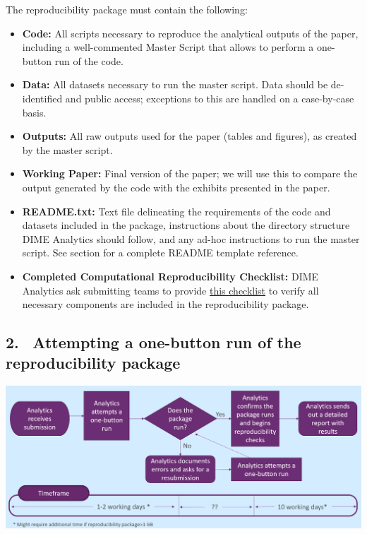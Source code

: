 \begin{fullwidth}
	The reproducibility package must contain the following:

	\bigskip

	\begin{itemize}
		\setlength\itemsep{-0.1em}
		\item \textbf{Code:} All scripts necessary to reproduce the analytical outputs of the paper, including a well-commented Master Script that allows to perform a one-button run of the code.
		\item \textbf{Data:} All datasets necessary to run the master script. Data should be de-identified and public access; exceptions to this are handled on a case-by-case basis.
		\item \textbf{Outputs:} All raw outputs used for the paper (tables and figures), as created by the master script.
		\item \textbf{Working Paper:} Final version of the paper; we will use this to compare the output generated by the code with the exhibits presented in the paper.
		\item \textbf{README.txt:} Text file delineating the requirements of the code and datasets included in the package, instructions about the directory structure DIME Analytics should follow, and any ad-hoc instructions to run the master script. See section  for a complete README template reference.
		\item \textbf{Completed Computational Reproducibility Checklist:} DIME Analytics ask submitting teams to provide \href{https://raw.githubusercontent.com/worldbank/dime-standards/master/dime-research-standards/pillar-3-research-reproducibility/checklists/Reproducibility%20package%20submission%20checklist.pdf}{this checklist} to verify all necessary components are included in the reproducibility package.
	\end{itemize}

	\subsection{2. \, Attempting a one-button run of the reproducibility package}

	\bigskip

	\begin{center}
		\includegraphics[width=0.9\linewidth]{../img/rep-checks-timeline.png}
	\end{center}


\end{fullwidth}
